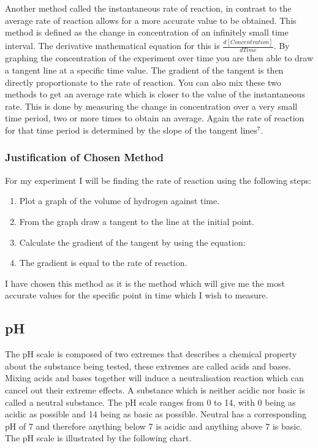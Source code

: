 Another method called the instantaneous rate of reaction, in contrast to the average rate of reaction allows for a more accurate value to be obtained. This method is defined as the change in concentration of an infinitely small time interval. The derivative mathematical equation for this is $\frac{d[Concentration]}{dTime}$. By graphing the concentration of the experiment over time you are then able to draw a tangent line at a specific time value. The gradient of the tangent is then directly proportionate to the rate of reaction. You can also mix these two methods to get an average rate which is closer to the value of the instantaneous rate. This is done by measuring the change in concentration over a very small time period, two or more times to obtain an average. Again the rate of reaction for that time period is determined by the slope of the tangent lines$^7$.





		\subsubsection{Justification of Chosen Method}

For my experiment I will be finding the rate of reaction using the following steps:

\begin{enumerate}
\item Plot a graph of the volume of hydrogen against time.
\item From the graph draw a tangent to the line at the initial point.
\item Calculate the gradient of the tangent by using the equation: 
\item The gradient is equal to the rate of reaction.
\end{enumerate}

I have chosen this method as it is the method which will give me the most accurate values for the specific point in time which I wish to measure. 






	\subsection{pH}

The pH scale is composed of two extremes that describes a chemical property about the substance being tested, these extremes are called acids and bases. Mixing acids and bases together will induce a neutralisation reaction which can cancel out their extreme effects. A substance which is neither acidic nor basic is called a neutral substance. The pH scale ranges from 0 to 14, with 0 being as acidic as possible and 14 being as basic as possible. Neutral has a corresponding pH of 7 and therefore anything below 7 is acidic and anything above 7 is basic. The pH scale is illustrated by the following chart.


